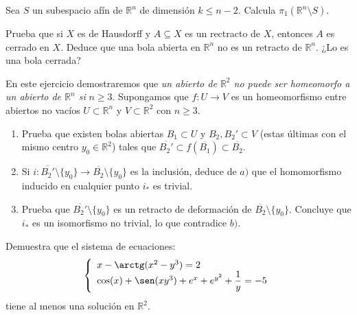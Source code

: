 \begin{ejercicio}
    Sea $S$ un subespacio afín de $\mathbb{R}^n$ de dimensión $k\leq n-2$. Calcula $\pi_1(\mathbb{R}^n\setminus S)$.
\end{ejercicio}

\begin{ejercicio}
    Prueba que si $X$ es de Hausdorff y $A\subseteq X$ es un rectracto de $X$, entonces $A$ es cerrado en $X$. Deduce que una bola abierta en $\mathbb{R}^n$ no es un retracto de $\mathbb{R}^n$. ¿Lo es una bola cerrada?
\end{ejercicio}

\begin{ejercicio}
    En este ejercicio demostraremos que \textit{un abierto de $\mathbb{R}^2$ no puede ser homeomorfo a un abierto de $\mathbb{R}^n$ si} $n\geq 3$. Supongamos que $f:U\to V$ es un homeomorfismo entre abiertos no vacíos $U\subset \mathbb{R}^n$ y $V\subset \mathbb{R}^2$ con $n\geq 3$.
    \begin{enumerate}[label=\alph*)]
        \item Prueba que existen bolas abiertas $B_1\subset U$ y $B_2,B_2'\subset V$ (estas últimas con el mismo centro $y_0\in \mathbb{R}^2$) tales que $\overline{B_2'}\subset f(\overline{B_1})\subset \overline{B_2}$.
        \item Si $i:\overline{B_2'}\setminus \{y_0\}\to \overline{B_2}\setminus \{y_0\}$ es la inclusión, deduce de $a)$ que el homomorfismo inducido en cualquier punto $i_\ast$ es trivial.
        \item Prueba que $\overline{B_2'}\setminus \{y_0\}$ es un retracto de deformación de $\overline{B_2}\setminus \{y_0\}$. Concluye que $i_\ast$ es un isomorfismo no trivial, lo que contradice $b)$.
    \end{enumerate}
\end{ejercicio}

\begin{ejercicio}
    Demuestra que el sistema de ecuaciones:
    \begin{equation*}
        \left\{\begin{array}{l}
            x-\arctg(x^2-y^3) = 2 \\
            \cos(x) + \sen(xy^3) + e^x + e^{y^2} + \dfrac{1}{y} = -5
        \end{array}\right.
    \end{equation*}
    tiene al menos una solución en $\mathbb{R}^2$.
\end{ejercicio}

